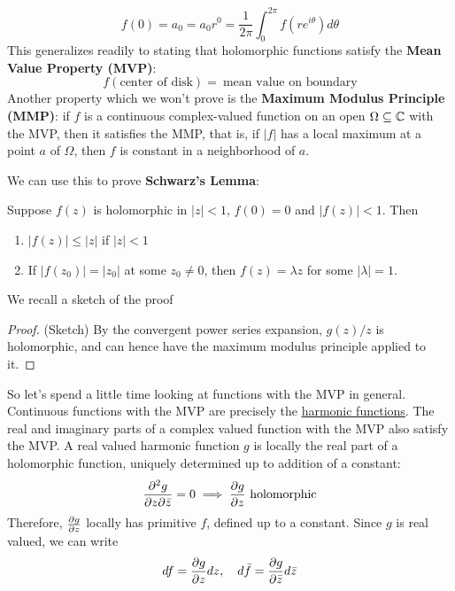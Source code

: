 \documentclass{article}
\begin{document}
\begin{equation}f(0) = a_0 = a_0r^0 = \frac{1}{2\pi}\int_0^{2\pi}f(re^{i\theta})d\theta\end{equation}
This generalizes readily to stating that holomorphic functions satisfy the \textbf{Mean Value Property (MVP)}:
\begin{equation}f(\text{center of disk}) = \ \text{mean value on boundary}\end{equation}
Another property which we won't prove is the \textbf{Maximum Modulus Principle (MMP)}: if \(f\) is a continuous complex-valued function on an open \(\Omega \subseteq \mathbb{C}\) with the MVP, then it satisfies the MMP, that is, if \(|f|\) has a local maximum at a point \(a\) of \(\Omega\), then \(f\) is constant in a neighborhood of \(a\).

We can use this to prove \textbf{Schwarz's Lemma}:
\begin{theorem}
Suppose \(f(z)\) is holomorphic in \(|z| < 1\), \(f(0) = 0\) and \(|f(z)| < 1\). Then
\begin{enumerate}

  \item \(|f(z)| \leq |z|\) if \(|z| < 1\)

  \item If \(|f(z_0)| = |z_0|\) at some \(z_0 \neq 0\), then \(f(z) = \lambda z\) for some \(|\lambda| = 1\).

\end{enumerate}
\end{theorem}
We recall a sketch of the proof
\begin{proof} (Sketch)
By the convergent power series expansion, \(g(z) / z\) is holomorphic, and can hence have the maximum modulus principle applied to it.
\end{proof}
So let's spend a little time looking at functions with the MVP in general. Continuous functions with the MVP are precisely the \underline{harmonic functions}. The real and imaginary parts of a complex valued function with the MVP also satisfy the MVP. A real valued harmonic function \(g\) is locally the real part of a holomorphic function, uniquely determined up to addition of a constant:
\begin{equation}
{\frac{\partial {^2g}}{\partial {z\partial\bar{z}}}} = 0 \implies {\frac{\partial {g}}{\partial {z}}} \ \text{holomorphic}
\end{equation}
Therefore, \({\frac{\partial {g}}{\partial {z}}}\) locally has primitive \(f\), defined up to a constant. Since \(g\) is real valued, we can write
\begin{equation}df = {\frac{\partial {g}}{\partial {z}}}dz, \quad d\bar{f} = {\frac{\partial {g}}{\partial {\bar{z}}}}d\bar{z}\end{equation}
\end{document}
